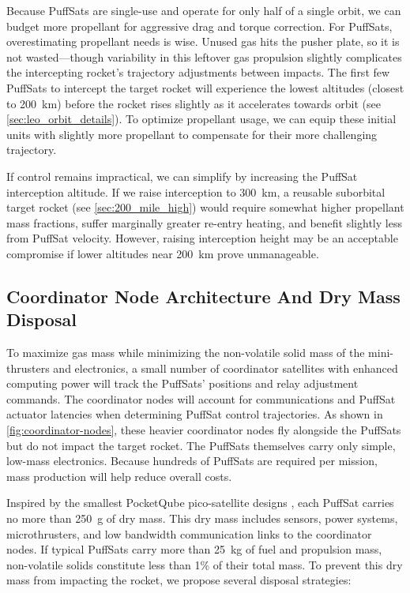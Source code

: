 \documentclass{article}
\begin{document}
Because PuffSats are single-use and operate for only half of a single orbit, we can budget more propellant for aggressive drag and torque correction. For PuffSats, overestimating propellant needs is wise. Unused gas hits the pusher plate, so it is not wasted—though variability in this leftover gas propulsion slightly complicates the intercepting rocket’s trajectory adjustments between impacts. The first few PuffSats to intercept the target rocket will experience the lowest altitudes (closest to \SI{200}{\kilo\meter}) before the rocket rises slightly as it accelerates towards orbit (see \autoref{sec:leo_orbit_details}). To optimize propellant usage, we can equip these initial units with slightly more propellant to compensate for their more challenging trajectory.

If control remains impractical, we can simplify by increasing the PuffSat interception altitude. If we raise interception to \SI{300}{\kilo\meter}, a reusable suborbital target rocket (see \autoref{sec:200_mile_high}) would require somewhat higher propellant mass fractions, suffer marginally greater re-entry heating, and benefit slightly less from PuffSat velocity. However, raising interception height may be an acceptable compromise if lower altitudes near \SI{200}{\kilo\meter} prove unmanageable.

\subsection{Coordinator Node Architecture And Dry Mass Disposal}\label{sec:coordinator_node_dry_mass_disposal}
To maximize gas mass while minimizing the non-volatile solid mass of the mini-thrusters and electronics, a small number of coordinator satellites with enhanced computing power will track the PuffSats' positions and relay adjustment commands.  The coordinator nodes will account for communications and PuffSat actuator latencies when determining PuffSat control trajectories.  As shown in \autoref{fig:coordinator-nodes}, these heavier coordinator nodes fly alongside the PuffSats but do not impact the target rocket. The PuffSats themselves carry only simple, low-mass electronics. Because hundreds of PuffSats are required per mission, mass production will help reduce overall costs.

Inspired by the smallest PocketQube pico-satellite designs \cite{pocketqube_mass_reference}, each PuffSat carries no more than \SI{250}{\gram} of dry mass.  This dry mass includes sensors, power systems, microthrusters, and low bandwidth communication links to the coordinator nodes.  If typical PuffSats carry more than \SI{25}{\kilo\gram} of fuel and propulsion mass, non-volatile solids constitute less than 1\% of their total mass. To prevent this dry mass from impacting the rocket, we propose several disposal strategies:
\end{document}
